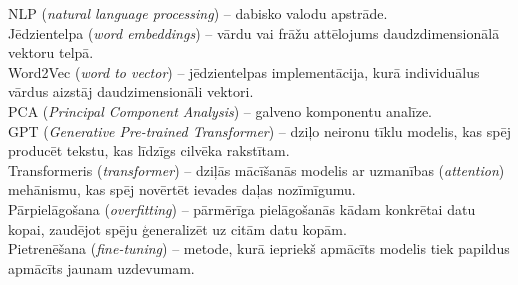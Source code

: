 NLP (\textit{natural language processing}) -- dabisko valodu apstrāde.\\
Jēdzientelpa (\textit{word embeddings}) -- vārdu vai frāžu attēlojums daudzdimensionālā vektoru telpā.\\
Word2Vec (\textit{word to vector}) -- jēdzientelpas implementācija, kurā individuālus vārdus aizstāj daudzimensionāli vektori.\\
PCA (\textit{Principal Component Analysis}) -- galveno komponentu analīze.\\
GPT (\textit{Generative Pre-trained Transformer}) – dziļo neironu tīklu modelis, kas spēj producēt tekstu, kas līdzīgs cilvēka rakstītam.\\
Transformeris (\textit{transformer}) -- dziļās mācīšanās modelis ar uzmanības (\textit{attention})  mehānismu, kas spēj novērtēt ievades daļas nozīmīgumu.\\
Pārpielāgošana (\textit{overfitting}) -- pārmērīga pielāgošanās kādam konkrētai datu kopai, zaudējot spēju ģeneralizēt uz citām datu kopām.\\
Pietrenēšana (\textit{fine-tuning}) -- metode, kurā iepriekš apmācīts modelis tiek papildus apmācīts jaunam uzdevumam.\\

